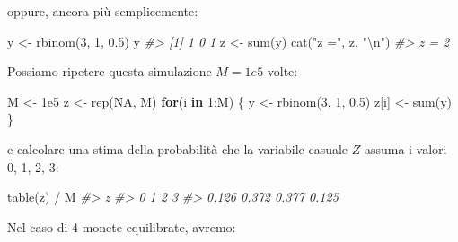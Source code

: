 \documentclass[
  10pt,
  italian,
  a4paper,
  extrafontsizes,onecolumn,openright
  ]{memoir}
\newenvironment{Shaded}{\begin{snugshade}}{\end{snugshade}}
\newcommand{\CommentTok}[1]{\textcolor[rgb]{0.56,0.35,0.01}{\textit{#1}}}
\newcommand{\ConstantTok}[1]{\textcolor[rgb]{0.00,0.00,0.00}{#1}}
\newcommand{\ControlFlowTok}[1]{\textcolor[rgb]{0.13,0.29,0.53}{\textbf{#1}}}
\newcommand{\DecValTok}[1]{\textcolor[rgb]{0.00,0.00,0.81}{#1}}
\newcommand{\FloatTok}[1]{\textcolor[rgb]{0.00,0.00,0.81}{#1}}
\newcommand{\FunctionTok}[1]{\textcolor[rgb]{0.00,0.00,0.00}{#1}}
\newcommand{\NormalTok}[1]{#1}
\newcommand{\OtherTok}[1]{\textcolor[rgb]{0.56,0.35,0.01}{#1}}
\newcommand{\SpecialCharTok}[1]{\textcolor[rgb]{0.00,0.00,0.00}{#1}}
\newcommand{\StringTok}[1]{\textcolor[rgb]{0.31,0.60,0.02}{#1}}
\theoremstyle{definition}
\theoremstyle{definition}
\theoremstyle{definition}
\theoremstyle{definition}
\theoremstyle{remark}
\begin{document}
\noindent
oppure, ancora più semplicemente:

\begin{Shaded}
\begin{Highlighting}[]
\NormalTok{y }\OtherTok{\textless{}{-}} \FunctionTok{rbinom}\NormalTok{(}\DecValTok{3}\NormalTok{, }\DecValTok{1}\NormalTok{, }\FloatTok{0.5}\NormalTok{)}
\NormalTok{y}
\CommentTok{\#\textgreater{} [1] 1 0 1}
\NormalTok{z }\OtherTok{\textless{}{-}} \FunctionTok{sum}\NormalTok{(y)}
\FunctionTok{cat}\NormalTok{(}\StringTok{"z ="}\NormalTok{, z, }\StringTok{"}\SpecialCharTok{\textbackslash{}n}\StringTok{"}\NormalTok{)}
\CommentTok{\#\textgreater{} z = 2}
\end{Highlighting}
\end{Shaded}

\noindent
Possiamo ripetere questa simulazione \(M = 1e5\) volte:

\begin{Shaded}
\begin{Highlighting}[]
\NormalTok{M }\OtherTok{\textless{}{-}} \FloatTok{1e5}
\NormalTok{z }\OtherTok{\textless{}{-}} \FunctionTok{rep}\NormalTok{(}\ConstantTok{NA}\NormalTok{, M)}
\ControlFlowTok{for}\NormalTok{(i }\ControlFlowTok{in} \DecValTok{1}\SpecialCharTok{:}\NormalTok{M) \{}
\NormalTok{  y }\OtherTok{\textless{}{-}} \FunctionTok{rbinom}\NormalTok{(}\DecValTok{3}\NormalTok{, }\DecValTok{1}\NormalTok{, }\FloatTok{0.5}\NormalTok{)}
\NormalTok{  z[i] }\OtherTok{\textless{}{-}} \FunctionTok{sum}\NormalTok{(y)}
\NormalTok{\}}
\end{Highlighting}
\end{Shaded}

\noindent
e calcolare una stima della probabilità che la variabile casuale \(Z\) assuma i valori 0, 1, 2, 3:

\begin{Shaded}
\begin{Highlighting}[]
\FunctionTok{table}\NormalTok{(z) }\SpecialCharTok{/}\NormalTok{ M}
\CommentTok{\#\textgreater{} z}
\CommentTok{\#\textgreater{}     0     1     2     3 }
\CommentTok{\#\textgreater{} 0.126 0.372 0.377 0.125}
\end{Highlighting}
\end{Shaded}

Nel caso di 4 monete equilibrate, avremo:
\end{document}

